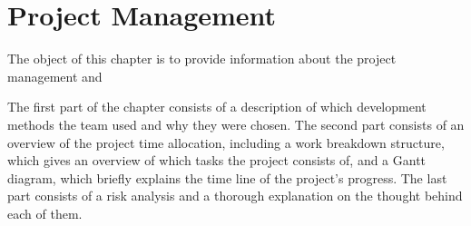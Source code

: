 \chapter{Project Management}
The object of this chapter is to provide information about the project management and  

The first part of the chapter consists of a description of which development methods the team used and why they were chosen. The second part consists of an overview of the project time allocation, including a work breakdown structure, which gives an overview of which tasks the project consists of, and a Gantt diagram, which briefly explains the time line of the project's progress. The last part consists of a risk analysis and a thorough explanation on the thought behind each of them.




\newpage



